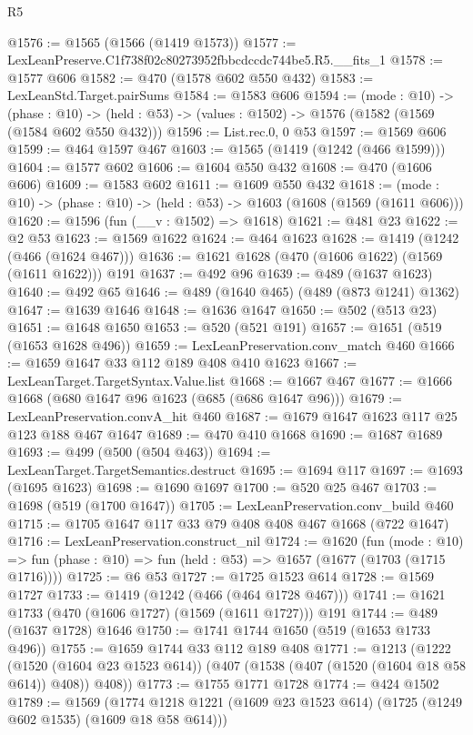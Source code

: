 \begin{lexlean}{R5}
\begin{coremodule}
@1576 := @1565 (@1566 (@1419 @1573))
@1577 := LexLeanPreserve.C1f738f02c80273952fbbcdccdc744be5.R5.__fits_1
@1578 := @1577 @606
@1582 := @470 (@1578 @602 @550 @432)
@1583 := LexLeanStd.Target.pairSums
@1584 := @1583 @606
@1594 := (mode : @10) ->
  (phase : @10) -> (held : @53) -> (values : @1502) -> @1576 (@1582 (@1569 (@1584 @602 @550 @432)))
@1596 := List.rec.{0, 0} @53
@1597 := @1569 @606
@1599 := @464 @1597 @467
@1603 := @1565 (@1419 (@1242 (@466 @1599)))
@1604 := @1577 @602
@1606 := @1604 @550 @432
@1608 := @470 (@1606 @606)
@1609 := @1583 @602
@1611 := @1609 @550 @432
@1618 := (mode : @10) -> (phase : @10) -> (held : @53) -> @1603 (@1608 (@1569 (@1611 @606)))
@1620 := @1596 (fun (__v : @1502) => @1618)
@1621 := @481 @23
@1622 := @2 @53
@1623 := @1569 @1622
@1624 := @464 @1623
@1628 := @1419 (@1242 (@466 (@1624 @467)))
@1636 := @1621 @1628 (@470 (@1606 @1622) (@1569 (@1611 @1622))) @191
@1637 := @492 @96
@1639 := @489 (@1637 @1623)
@1640 := @492 @65
@1646 := @489 (@1640 @465) (@489 (@873 @1241) @1362)
@1647 := @1639 @1646
@1648 := @1636 @1647
@1650 := @502 (@513 @23)
@1651 := @1648 @1650
@1653 := @520 (@521 @191)
@1657 := @1651 (@519 (@1653 @1628 @496))
@1659 := LexLeanPreservation.conv_match @460
@1666 := @1659 @1647 @33 @112 @189 @408 @410 @1623
@1667 := LexLeanTarget.TargetSyntax.Value.list
@1668 := @1667 @467
@1677 := @1666 @1668 (@680 @1647 @96 @1623 (@685 (@686 @1647 @96)))
@1679 := LexLeanPreservation.convA_hit @460
@1687 := @1679 @1647 @1623 @117 @25 @123 @188 @467 @1647
@1689 := @470 @410 @1668
@1690 := @1687 @1689
@1693 := @499 (@500 (@504 @463))
@1694 := LexLeanTarget.TargetSemantics.destruct
@1695 := @1694 @117
@1697 := @1693 (@1695 @1623)
@1698 := @1690 @1697
@1700 := @520 @25 @467
@1703 := @1698 (@519 (@1700 @1647))
@1705 := LexLeanPreservation.conv_build @460
@1715 := @1705 @1647 @117 @33 @79 @408 @408 @467 @1668 (@722 @1647)
@1716 := LexLeanPreservation.construct_nil
@1724 := @1620
    (fun (mode : @10) =>
    fun (phase : @10) => fun (held : @53) => @1657 (@1677 (@1703 (@1715 @1716))))
@1725 := @6 @53
@1727 := @1725 @1523 @614
@1728 := @1569 @1727
@1733 := @1419 (@1242 (@466 (@464 @1728 @467)))
@1741 := @1621 @1733 (@470 (@1606 @1727) (@1569 (@1611 @1727))) @191
@1744 := @489 (@1637 @1728) @1646
@1750 := @1741 @1744 @1650 (@519 (@1653 @1733 @496))
@1755 := @1659 @1744 @33 @112 @189 @408
@1771 := @1213
    (@1222
      (@1520 (@1604 @23 @1523 @614))
      (@407 (@1538 (@407 (@1520 (@1604 @18 @58 @614)) @408)) @408))
@1773 := @1755 @1771 @1728
@1774 := @424 @1502
@1789 := @1569
    (@1774 @1218 @1221 (@1609 @23 @1523 @614) (@1725 (@1249 @602 @1535) (@1609 @18 @58 @614)))

\end{coremodule}
\end{lexlean}
